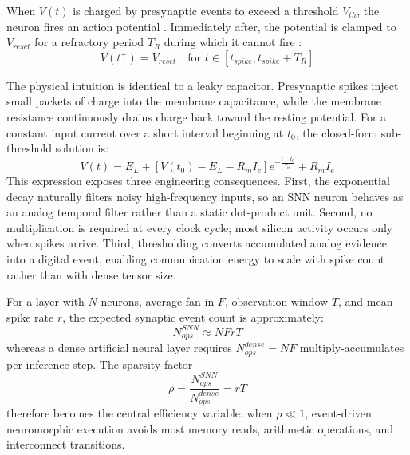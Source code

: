 \documentclass[11pt]{article}
\begin{document}
When $V(t)$ is charged by presynaptic events to exceed a threshold $V_{th}$, the neuron fires an action potential \cite{davies2021loihi,furber2014spinnaker}. Immediately after, the potential is clamped to $V_{reset}$ for a refractory period $T_R$ during which it cannot fire \cite{davies2021loihi,schuman2017survey,furber2014spinnaker}:
$$V(t^+) = V_{reset} \quad \text{for } t \in [t_{spike}, t_{spike} + T_R]$$

The physical intuition is identical to a leaky capacitor. Presynaptic spikes inject small packets of charge into the membrane capacitance, while the membrane resistance continuously drains charge back toward the resting potential. For a constant input current over a short interval beginning at $t_0$, the closed-form sub-threshold solution is:
$$V(t)=E_L+\left[V(t_0)-E_L-R_m I_e\right]e^{-\frac{t-t_0}{\tau_m}}+R_m I_e$$
This expression exposes three engineering consequences. First, the exponential decay naturally filters noisy high-frequency inputs, so an SNN neuron behaves as an analog temporal filter rather than a static dot-product unit. Second, no multiplication is required at every clock cycle; most silicon activity occurs only when spikes arrive. Third, thresholding converts accumulated analog evidence into a digital event, enabling communication energy to scale with spike count rather than with dense tensor size.

For a layer with $N$ neurons, average fan-in $F$, observation window $T$, and mean spike rate $r$, the expected synaptic event count is approximately:
$$N_{ops}^{SNN} \approx NFrT$$
whereas a dense artificial neural layer requires $N_{ops}^{dense}=NF$ multiply-accumulates per inference step. The sparsity factor
$$\rho=\frac{N_{ops}^{SNN}}{N_{ops}^{dense}}=rT$$
therefore becomes the central efficiency variable: when $\rho \ll 1$, event-driven neuromorphic execution avoids most memory reads, arithmetic operations, and interconnect transitions.
\end{document}
